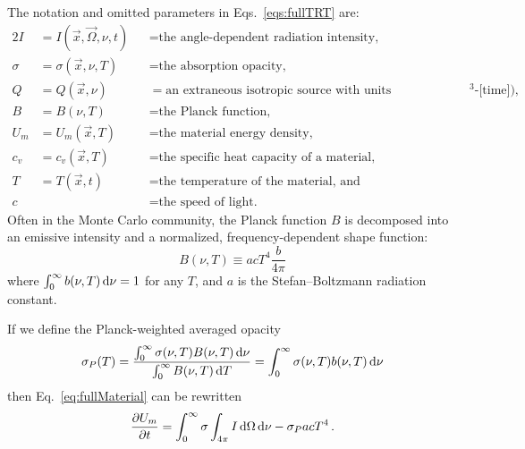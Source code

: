 \documentclass[11pt]{SRJresearch}
\begin{document}
The notation and omitted parameters in Eqs.~\eqref{eqs:fullTRT} are:
\begin{alignat*}{2}
  I &= I(\vec{x}, \vec{\Omega}, \nu, t) &&= \text{the angle-dependent
  radiation intensity,}
  \\
  \sigma &= \sigma(\vec{x}, \nu, T) &&= \text{the absorption opacity,} 
  \\
  Q &= Q(\vec{x}, \nu) &&= \text{an extraneous isotropic source with units
  [energy]/([length]$^3$-[time]),}
  \\
  B &= B(\nu, T) &&= \text{the Planck function,}
  \\
  U_m &= U_m(\vec{x}, T) &&= \text{the material energy density,}
  \\
  c_v &= c_v(\vec{x}, T) &&= \text{the specific heat capacity of a material,}
  \\
  T &= T(\vec{x}, t) &&= \text{the temperature of the material, and}
  \\
  c& &&= \text{the speed of light.}
\end{alignat*}
Often in the Monte Carlo community, the Planck function $B$ is decomposed into
an emissive intensity and a normalized, frequency-dependent shape function:
\begin{equation*}
  B(\nu, T) \equiv a c T^4 \frac{b}{4\pi}
\end{equation*}
where $\int_{0}^{\infty} b(\nu,T) \mathop{}\!\mathrm{d} \nu=1$ for any $T$, and $a$ is the
Stefan--Boltzmann radiation constant.

If we define the Planck-weighted averaged opacity
\begin{equation} \label{eq:planckCrossSection}
  \sigma_P(T) = \frac{\int_{0}^{\infty} \sigma(\nu, T) B(\nu,T) \mathop{}\!\mathrm{d}
  \nu}{\int_{0}^{\infty}B(\nu, T) \mathop{}\!\mathrm{d} T}
  = \int_{0}^{\infty} \sigma(\nu, T) b(\nu, T) \mathop{}\!\mathrm{d} \nu
\end{equation}
then Eq.~\eqref{eq:fullMaterial} can be rewritten
\begin{equation} \label{eq:fullMaterialSimplified}
  \frac{\partial U_m}{\partial t} = \int_{0}^{\infty} \sigma  \int_{4\pi} I \mathop{}\!\mathrm{d} \Omega\mathop{}\!\mathrm{d} \nu -
  \sigma_P ac T^4 \,.
\end{equation}
\end{document}
